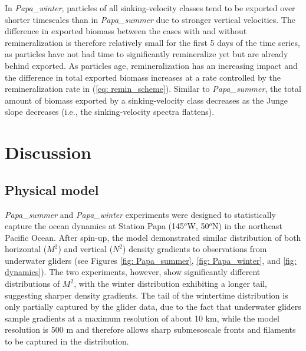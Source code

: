 \documentclass[draft,linenumbers]{agujournal2018}
\begin{document}
 In \textit{Papa\_winter}, particles of all sinking-velocity classes tend to be exported over shorter timescales than in \textit{Papa\_summer} due to stronger vertical velocities. The difference in exported biomass between the cases with and without remineralization is therefore relatively small for the first 5 days of the time series, as particles have not had time to significantly remineralize yet but are already behind exported. As particles age, remineralization has an increasing impact and the difference in total exported biomass increases at a rate controlled by the remineralization rate in (\ref{eq: remin_scheme}). Similar to \textit{Papa\_summer}, the total amount of biomass exported by a sinking-velocity class decreases as the Junge slope decreases (i.e., the sinking-velocity spectra flattens). %

\section{Discussion}
\label{sec: Discussion}

\subsection{Physical model}
\label{sec: Discussion_model}
\textit{Papa\_summer} and \textit{Papa\_winter} experiments were designed to statistically capture the ocean dynamics at Station Papa (145$^o$W, 50$^o$N) in the northeast Pacific Ocean. After spin-up, the model demonstrated similar distribution of both horizontal ($M^2$) and vertical ($N^2$) density gradients to observations from underwater gliders (see Figures \ref{fig: Papa_summer}, \ref{fig: Papa_winter}, and \ref{fig: dynamics}). The two experiments, however, show significantly different distributions of $M^2$, with the winter distribution exhibiting a longer tail, suggesting sharper density gradients. The tail of the wintertime distribution is only partially captured by the glider data, due to the fact that underwater gliders sample gradients at a maximum resolution of about 10 km, while the model resolution is 500 m and therefore allows sharp submesoscale fronts and filaments to be captured in the distribution.
\end{document}
